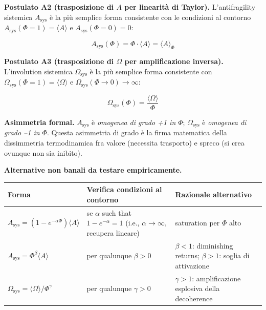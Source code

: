 \Hypoth{} \textbf{Postulato A2 (trasposizione di \(A\) per linearità di
Taylor).} L'antifragility sistemica \(A_{\text{sys}}\) è la più semplice
forma consistente con le condizioni al contorno
\(A_{\text{sys}}(\Phi=1) = \langle A\rangle\) e
\(A_{\text{sys}}(\Phi=0) = 0\):

\[
A_{\text{sys}}(\Phi) = \Phi \cdot \langle A \rangle = \langle A \rangle_\Phi
\]

\Hypoth{} \textbf{Postulato A3 (trasposizione di \(\Omega\) per
amplificazione inversa).} L'involution sistemica
\(\Omega_{\text{sys}}\) è la più semplice forma consistente con
\(\Omega_{\text{sys}}(\Phi=1) = \langle\Omega\rangle\) e
\(\Omega_{\text{sys}}(\Phi \to 0) \to \infty\):

\[
\Omega_{\text{sys}}(\Phi) = \frac{\langle \Omega \rangle}{\Phi}
\]

\Proved{} \textbf{Asimmetria formal.} \(A_{\text{sys}}\) è
\emph{omogenea di grado +1 in \(\Phi\)}; \(\Omega_{\text{sys}}\) è
\emph{omogenea di grado --1 in \(\Phi\)}. Questa asimmetria di grado è la
firma matematica della dissimmetria termodinamica fra valore (necessita
trasporto) e spreco (si crea ovunque non sia inibito).

\Conj{} \textbf{Alternative non banali da testare empiricamente.}

{\def\LTcaptype{none} %
{\small\begin{longtable}[]{@{}
  >{\raggedright\arraybackslash}p{}
  >{\raggedright\arraybackslash}p{}
  >{\raggedright\arraybackslash}p{}@{}}
\toprule\noalign{}
\begin{minipage}[b]{\linewidth}\raggedright
Forma
\end{minipage} & \begin{minipage}[b]{\linewidth}\raggedright
Verifica condizioni al contorno
\end{minipage} & \begin{minipage}[b]{\linewidth}\raggedright
Razionale alternativo
\end{minipage} \\
\midrule\noalign{}
\endhead
\bottomrule\noalign{}
\endlastfoot
\(A_{\text{sys}} = (1 - e^{-\alpha\Phi})\langle A\rangle\) & \Proved{}
se \(\alpha\) such that \(1-e^{-\alpha} = 1\) (i.e.,
\(\alpha \to \infty\), recupera lineare) & saturation per \(\Phi\)
alto \\
\(A_{\text{sys}} = \Phi^\beta \langle A\rangle\) & \Proved{} per
qualunque \(\beta > 0\) & \(\beta < 1\): diminishing returns;
\(\beta > 1\): soglia di attivazione \\
\(\Omega_{\text{sys}} = \langle\Omega\rangle / \Phi^\gamma\) & \Proved{}
per qualunque \(\gamma > 0\) & \(\gamma > 1\): amplificazione esplosiva
della decoherence \\
\end{longtable}}
}

